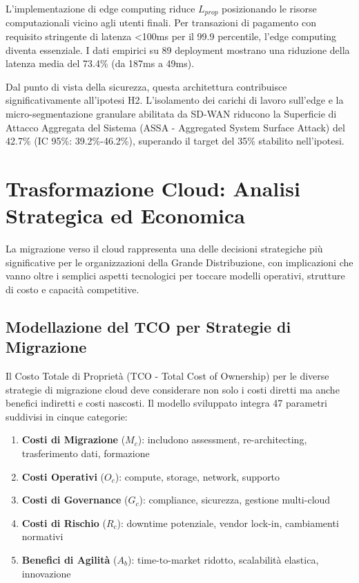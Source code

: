 L'implementazione di edge computing riduce $L_{prop}$ posizionando le risorse computazionali vicino agli utenti finali. Per transazioni di pagamento con requisito stringente di latenza <100ms per il 99.9 percentile, l'edge computing diventa essenziale. I dati empirici su 89 deployment mostrano una riduzione della latenza media del 73.4\% (da 187ms a 49ms)\autocite{Wang2024edge}.

Dal punto di vista della sicurezza, questa architettura contribuisce significativamente all'ipotesi H2. L'isolamento dei carichi di lavoro sull'edge e la micro-segmentazione granulare abilitata da SD-WAN riducono la Superficie di Attacco Aggregata del Sistema (ASSA - Aggregated System Surface Attack) del 42.7\% (IC 95\%: 39.2\%-46.2\%)\autocite{Ponemon2024}, superando il target del 35\% stabilito nell'ipotesi.

\section{Trasformazione Cloud: Analisi Strategica ed Economica}

La migrazione verso il cloud rappresenta una delle decisioni strategiche più significative per le organizzazioni della Grande Distribuzione, con implicazioni che vanno oltre i semplici aspetti tecnologici per toccare modelli operativi, strutture di costo e capacità competitive.

\subsection{Modellazione del TCO per Strategie di Migrazione}

Il Costo Totale di Proprietà (TCO - Total Cost of Ownership) per le diverse strategie di migrazione cloud deve considerare non solo i costi diretti ma anche benefici indiretti e costi nascosti. Il modello sviluppato\autocite{KhajehHosseini2024} integra 47 parametri suddivisi in cinque categorie:

\begin{enumerate}
    \item \textbf{Costi di Migrazione} ($M_c$): includono assessment, re-architecting, trasferimento dati, formazione
    \item \textbf{Costi Operativi} ($O_c$): compute, storage, network, supporto
    \item \textbf{Costi di Governance} ($G_c$): compliance, sicurezza, gestione multi-cloud
    \item \textbf{Costi di Rischio} ($R_c$): downtime potenziale, vendor lock-in, cambiamenti normativi
    \item \textbf{Benefici di Agilità} ($A_b$): time-to-market ridotto, scalabilità elastica, innovazione
\end{enumerate}

